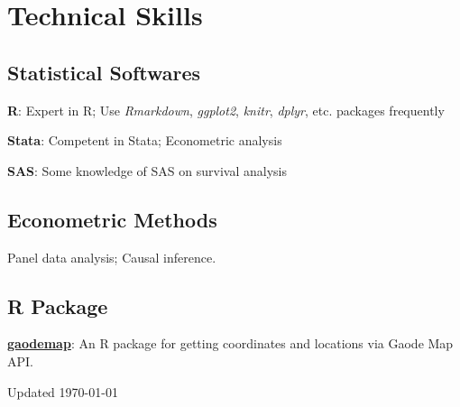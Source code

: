 \documentclass[12pt,letterpaper]{report}
\newcommand{\listitemspace}{0.35em}
\renewenvironment{itemize}
{\begin{list}{}{\setlength{\leftmargin}{0em}
            \setlength{\parskip}{0em}
            \setlength{\itemsep}{\listitemspace}
            \setlength{\parsep}{\listitemspace}}}
    {\end{list}}
\begin{document}

    \section*{Technical Skills}

    \subsection*{Statistical Softwares}

    \begin{itemize}

        \item \textbf{R}: Expert in R; Use \textit{Rmarkdown}, \textit{ggplot2}, \textit{knitr}, \textit{dplyr}, etc. packages frequently
        \item \textbf{Stata}: Competent in Stata; Econometric analysis
        \item \textbf{SAS}: Some knowledge of SAS on survival analysis

    \end{itemize}
   
    \subsection*{Econometric Methods}

    \begin{itemize}

        \item Panel data analysis; Causal inference.

    \end{itemize}

    \subsection*{R Package}
    \begin{itemize}

 	\item \href{https://github.com/xiaojunlin/gaodemap}{\textbf{gaodemap}}: An R package for getting coordinates and locations via Gaode Map API. 

    \end{itemize}

    \begin{center}
        \vfill
        Updated \monthyeardate\today
    \end{center}
\end{document}
